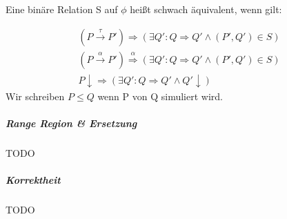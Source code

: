 \documentclass[a4paper,12pt,smallheadings]{scrartcl}
\begin{document}
Eine binäre Relation S auf $\phi$ heißt schwach äquivalent, wenn gilt:

\begin{eqnarray}
(P \overset{\tau}{\rightarrow} P') \Rightarrow (\exists Q': Q \Rightarrow Q' \wedge (P', Q') \in S) \\
(P \overset{\alpha}{\rightarrow} P') \overset{\alpha}{\Rightarrow} (\exists Q': Q \Rightarrow Q' \wedge (P', Q') \in S) \\
P \downarrow \Rightarrow (\exists Q':Q \Rightarrow Q' \wedge Q' \downarrow)
\end{eqnarray}
Wir schreiben $P \leq Q$ wenn P von Q simuliert wird.

\subparagraph{Range Region \& Ersetzung}
TODO

\subparagraph{Korrektheit}
TODO
\end{document}
